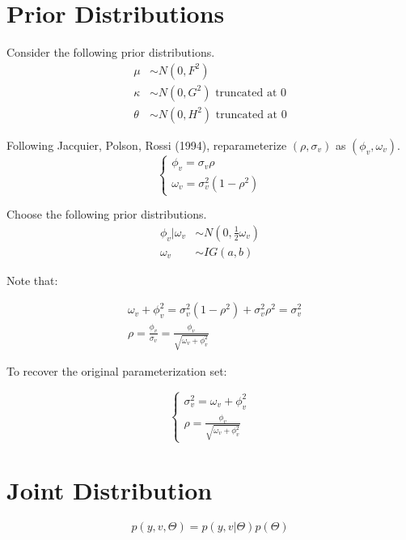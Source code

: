 \documentclass{article}
\begin{document}
\normalsize
\section{Prior Distributions}
Consider the following prior distributions.
\begin{align*}
\mu &\sim N(0,F^2) \\
\kappa &\sim N(0,G^2) \text{ truncated at 0}\\
\theta &\sim N(0,H^2) \text{ truncated at 0}
\end{align*}

Following Jacquier, Polson, Rossi (1994), reparameterize $(\rho,\sigma_v)$ as $(\phi_v,\omega_v)$.
\begin{equation}
\begin{cases}
\phi_v = \sigma_v \rho \\
\omega_v = \sigma^2_v(1-\rho^2)
\end{cases}
\end{equation}

Choose the following prior distributions.
\begin{align*}
\phi_v|\omega_v &\sim N(0,\frac{1}{2}{\omega_v}) \\
\omega_v &\sim IG(a,b)
\end{align*}

Note that:

\begin{align}
&\omega_v+\phi_v^2=\sigma_v^2(1-\rho^2)+\sigma_v^2\rho^2 =\sigma_v^2\\
&\rho=\frac{\phi_v}{\sigma_v}=\frac{\phi_v}{\sqrt{\omega_v+\phi_v^2}}
\end{align}

To recover the original parameterization set:

\begin{equation}
\begin{cases}
\sigma_v^2=\omega_v+\phi_v^2 \\
\rho = \frac{\phi_v}{\sqrt{\omega_v+\phi_v^2}}
\end{cases}
\end{equation}

\section{Joint Distribution}

\begin{equation}
p(y,v,\Theta) = p(y,v|\Theta)p(\Theta)
\end{equation}
\end{document}
